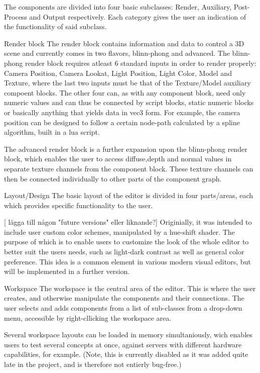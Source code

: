 The components are divided into four basic subclasses: Render, Auxiliary, Post-Process and Output respectively. Each category 
gives the user an indication of the functionality of said subclass. 

Render block
The render block contains information and data to control a 3D scene and currently comes in two flavors, blinn-phong and advanced. The blinn-phong render block requires atleast 6 standard inputs in order to render properly: Camera Position, Camera Lookat, Light Position, Light Color, Model and Texture, where the last two inputs must be that of the Texture/Model auxiliary compoent blocks. The other four can, as with any component block, need only numeric values and can thus be connected by script blocks, static numeric blocks or basically anything that yields data in vec3 form. For example, the camera position can be designed to follow a certain node-path calculated by a spline algorithm, built in a lua script. 

The advanced render block is a further expansion upon the blinn-phong render block, which enables the user to access diffuse,depth  and normal values in separate texture channels from the component block. These texture channels can then be connected individually to other parts of the component graph. 

Layout/Design
The basic layout of the editor is divided in four parts/areas, each which provides specific functionality to the user. 

[ lägga till någon "future versions" eller liknande?]
Originially, it was intended to include user custom color schemes, manipulated by a hue-shift shader. The purpose of which is to enable users to customize the look of the whole editor to better suit the users needs, such as light-dark contrast as well as general color preference. This idea is a common element in various modern visual editors, but will be implemented in a further version. 

Workspace
The workspace is the central area of the editor. This is where the user creates, and otherwise manipulate the components and their connections. The user selects and adds components from a list of sub-classes from a drop-down menu, accessible by right-cllicking the workspace area. 

Several workspace layouts can be loaded in memory simultaniously, wich enables users to test several concepts at once, against servers with different hardware capabilities, for example. (Note, this is currently disabled as it was added quite late in the project, and is therefore not entierly bug-free.)

